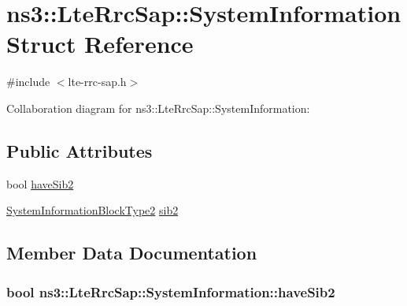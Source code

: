 \hypertarget{structns3_1_1LteRrcSap_1_1SystemInformation}{}\section{ns3\+:\+:Lte\+Rrc\+Sap\+:\+:System\+Information Struct Reference}
\label{structns3_1_1LteRrcSap_1_1SystemInformation}


{\ttfamily \#include $<$lte-\/rrc-\/sap.\+h$>$}



Collaboration diagram for ns3\+:\+:Lte\+Rrc\+Sap\+:\+:System\+Information\+:
\subsection*{Public Attributes}
\begin{DoxyCompactItemize}
\item 
bool \hyperlink{structns3_1_1LteRrcSap_1_1SystemInformation_a49b207811d5abab83195aa32513498c0}{have\+Sib2}
\item 
\hyperlink{structns3_1_1LteRrcSap_1_1SystemInformationBlockType2}{System\+Information\+Block\+Type2} \hyperlink{structns3_1_1LteRrcSap_1_1SystemInformation_af016b1a6316f1fbec78ccbeb3160207c}{sib2}
\end{DoxyCompactItemize}


\subsection{Member Data Documentation}
\subsubsection[{\texorpdfstring{have\+Sib2}{haveSib2}}]{\setlength{\rightskip}{0pt plus 5cm}bool ns3\+::\+Lte\+Rrc\+Sap\+::\+System\+Information\+::have\+Sib2}\hypertarget{structns3_1_1LteRrcSap_1_1SystemInformation_a49b207811d5abab83195aa32513498c0}{}\label{structns3_1_1LteRrcSap_1_1SystemInformation_a49b207811d5abab83195aa32513498c0}
